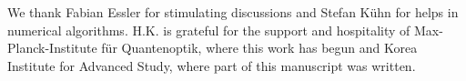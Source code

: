 \documentclass[twocolumn,superscriptaddress, prb]{revtex4-1}
\begin{document}
We thank Fabian Essler for stimulating discussions and Stefan K\"{u}hn for helps in numerical algorithms.
H.K. is grateful for the support and hospitality of Max-Planck-Institute f\"{u}r Quantenoptik,
where this work has begun and Korea Institute for Advanced Study, where part of this manuscript was written.




%
%
%
%
%
%
%
%
%
%
%
%
%
%
%
%
%
%
%
%
%
%
%
%
%
\end{document}
